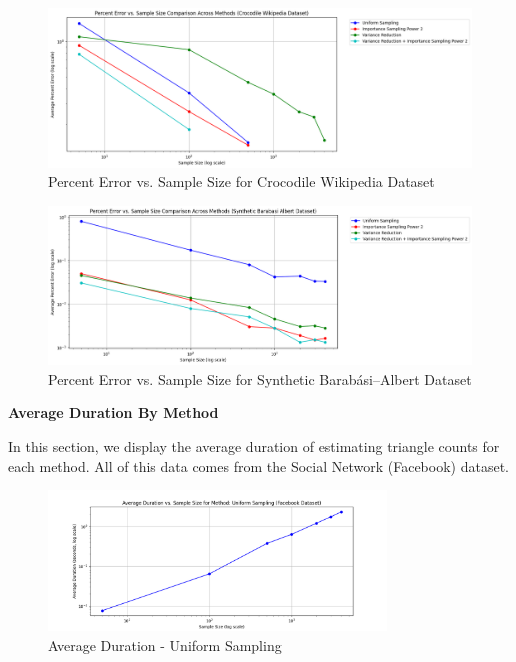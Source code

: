 \documentclass[11pt]{article}
\newcommand{\subsubsubsection}[1]{
  \vspace{1em} %
  \noindent\textbf{#1} %
  \vspace{0.5em} %
}
\begin{document}
\begin{figure}[H]
\centering
\includegraphics[width=0.9\linewidth]{plots/comparisons/croc/limited_method_percent_error_vs_sample_size_comparison.png}
\caption{Percent Error vs. Sample Size for Crocodile Wikipedia Dataset}
\label{fig:croc_sample_size}
\end{figure}

\begin{figure}[H]
\centering
\includegraphics[width=0.9\linewidth]{plots/comparisons/ba/limited_method_percent_error_vs_sample_size_comparison.png}
\caption{Percent Error vs. Sample Size for Synthetic Barabási–Albert Dataset}
\label{fig:ba_sample_size}
\end{figure}

\subsubsubsection{Average Duration By Method}

In this section, we display the average duration of estimating triangle counts for each method.
All of this data comes from the Social Network (Facebook) dataset.

\begin{figure}[H]
    \centering
    \includegraphics[width=0.8\textwidth]{plots/durations/avg_duration_Uniform Sampling.png}
    \caption{Average Duration - Uniform Sampling}
    \label{fig:avg_duration_uniform}
\end{figure}
\end{document}

